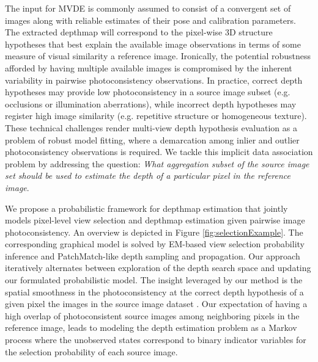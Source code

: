 The input for MVDE is commonly assumed to consist of a convergent set of images along with reliable estimates of their pose and calibration parameters. The extracted depthmap will correspond to the pixel-wise 3D structure hypotheses that best explain the available image observations in terms of some measure of visual similarity \wrt  a reference image.
Ironically, the potential robustness afforded by having multiple available images is compromised by the inherent variability in pairwise photoconsistency observations. In practice, correct depth hypotheses may provide low photoconsistency in a source image subset (e.g. occlusions or  illumination aberrations), while incorrect depth hypotheses may register high image similarity (e.g. repetitive structure or homogeneous texture). These technical challenges render multi-view depth hypothesis evaluation as a problem of robust model fitting, where a demarcation among inlier and outlier photoconsistency observations is required.
We tackle this implicit data association problem by addressing the question: {\em What aggregation subset of the source image set should be used to estimate the depth of a particular pixel in the reference image}.

We propose a probabilistic framework  for depthmap estimation that jointly models pixel-level view selection and depthmap estimation given pairwise image photoconsistency. An overview is depicted in Figure \ref{fig:selectionExample}.
The corresponding graphical model is solved by EM-based view selection probability inference and PatchMatch-like depth sampling and propagation.
Our approach iteratively alternates between exploration of  the depth search space and updating our formulated probabilistic model. The insight leveraged by our method is the spatial smoothness in the photoconsistency at the correct depth hypothesis of a given pixel \wrt the images in the source image dataset \cite{CombinedDepthOutlier,Goesele07}.
Our expectation of  having a high overlap of photoconsistent source images among neighboring pixels in the reference image, leads to modeling  the depth estimation problem as a Markov process where the unobserved states correspond to binary indicator variables for the selection probability of each source image.

